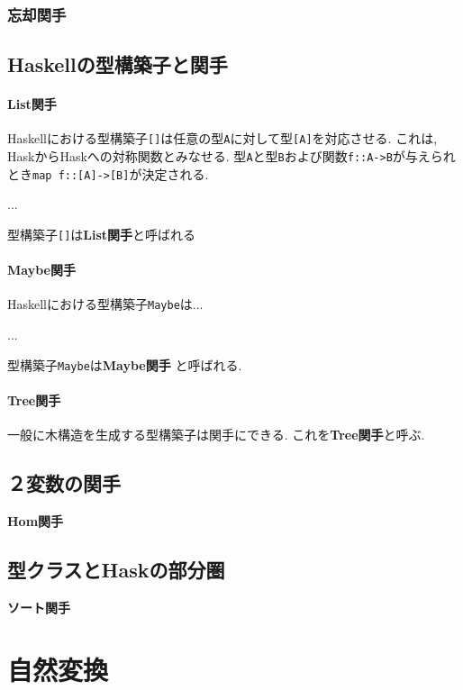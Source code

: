 \documentclass[dvipdfmx]{jsbook}
\theoremstyle{plain}
\begin{document}
\subsection{忘却関手}
\section{Haskellの型構築子と関手}
\subsubsection{List関手}
Haskellにおける型構築子\verb|[]|は任意の型\verb|A|に対して型\verb|[A]|を対応させる.
これは, HaskからHaskへの対称関数とみなせる.
型\verb|A|と型\verb|B|および関数\verb|f::A->B|が与えられとき\verb|map f::[A]->[B]|が決定される.

...

型構築子\verb|[]|は{\bf List関手}と呼ばれる
\subsubsection{Maybe関手}
Haskellにおける型構築子\verb|Maybe|は...

...

型構築子\verb|Maybe|は{\bf Maybe関手}
と呼ばれる.
\subsubsection{Tree関手}
一般に木構造を生成する型構築子は関手にできる. これを{\bf Tree関手}と呼ぶ.


\section{２変数の関手}
{\bf Hom関手}

\section{型クラスとHaskの部分圏}
{\bf ソート関手}


\chapter{自然変換}
\end{document}
